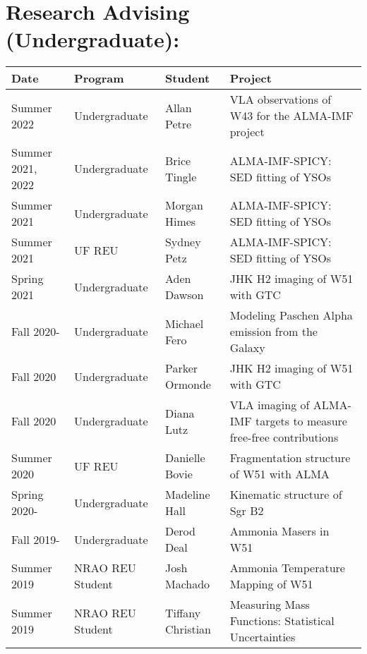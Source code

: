 \section*{Research Advising (Undergraduate): }
\vspace{-12pt}
\begin{tabular}{p{0.75in}p{1.3in}lp{2.6in}}
    Date  & Program & Student &  Project \\
    \hline
    Summer 2022 & Undergraduate &                               Allan Petre    &  VLA observations of W43 for the ALMA-IMF project \\
    Summer 2021, 2022 & Undergraduate &                         Brice Tingle    &  ALMA-IMF-SPICY: SED fitting of YSOs \\
    Summer 2021 & Undergraduate &                               Morgan Himes    &  ALMA-IMF-SPICY: SED fitting of YSOs \\
    Summer 2021 & UF REU &                                      Sydney Petz    &  ALMA-IMF-SPICY: SED fitting of YSOs \\
    Spring 2021 & Undergraduate &                               Aden Dawson    &  JHK H2 imaging of W51 with GTC \\
    Fall 2020- & Undergraduate &                               Michael Fero    &  Modeling Paschen Alpha emission from the Galaxy \\
    Fall 2020 & Undergraduate &                               Parker Ormonde    &  JHK H2 imaging of W51 with GTC \\
    Fall 2020 & Undergraduate &                               Diana Lutz    &  VLA imaging of ALMA-IMF targets to measure free-free contributions \\
    Summer 2020 & UF REU &                               Danielle Bovie    &  Fragmentation structure of W51 with ALMA \\
    Spring 2020- & Undergraduate &                               Madeline Hall    &  Kinematic structure of Sgr B2 \\
    Fall 2019- & Undergraduate &                               Derod Deal    &  Ammonia Masers in W51 \\
    Summer 2019 & NRAO REU Student &                                              Josh Machado    &  Ammonia Temperature Mapping of W51 \\
    Summer 2019 & NRAO REU Student &                                              Tiffany Christian    &  Measuring Mass Functions: Statistical Uncertainties \\

\end{tabular}
